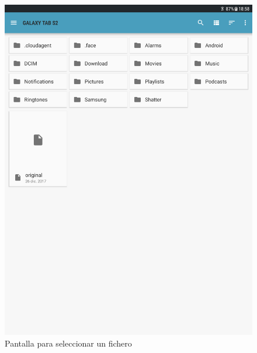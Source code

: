 \begin{figure}[ht]
  \centering
  \includegraphics[scale=0.2]{Figures/file_picker}
  \decoRule
  \caption[Shatter (File Picker)]{Pantalla para seleccionar un fichero}
  \label{fig:file_picker}
\end{figure}

